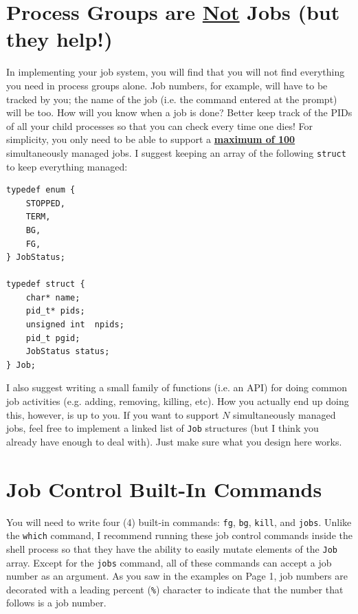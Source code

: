 \documentclass[10pt]{article}
\begin{document}
\section{Process Groups are \underline{Not} Jobs (but they help!)}

In implementing your job system, you will find that you will not find
everything you need in process groups alone.  Job numbers, for example,
will have to be tracked by you; the name of the job (i.e. the command
entered at the prompt) will be too.  How will you know when a job is
done?  Better keep track of the PIDs of all your child processes so that
you can check every time one dies!  For simplicity, you only need to be
able to support a \textbf{\underline{maximum of 100}} simultaneously
managed jobs.  I suggest keeping an array of the following
\texttt{struct} to keep everything managed:

\begin{verbatim}
typedef enum {
    STOPPED,
    TERM,
    BG,
    FG,
} JobStatus;

typedef struct {
    char* name;
    pid_t* pids;
    unsigned int  npids;
    pid_t pgid;
    JobStatus status;
} Job;
\end{verbatim}

I also suggest writing a small family of functions (i.e. an API) for
doing common job activities (e.g. adding, removing, killing, etc).  How
you actually end up doing this, however, is up to you.  If you want to
support $N$ simultaneously managed jobs, feel free to implement a linked
list of \texttt{Job} structures (but I think you already have enough to
deal with).  Just make sure what you design here works.


\section{Job Control Built-In Commands}

You will need to write four (4) built-in commands: \texttt{fg},
\texttt{bg}, \texttt{kill}, and \texttt{jobs}.  Unlike the
\texttt{which} command, I recommend running these job control commands
inside the shell process so that they have the ability to easily mutate
elements of the \texttt{Job} array.  Except for the \texttt{jobs}
command, all of these commands can accept a job number as an argument.
As you saw in the examples on Page 1, job numbers are decorated with a
leading percent (\texttt{\%}) character to indicate that the number that
follows is a job number.
\end{document}
